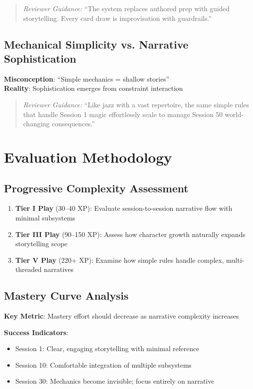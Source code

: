\documentclass[11pt]{article}
\begin{document}
\begin{quote}
\textit{Reviewer Guidance:} ``The system replaces authored prep with guided storytelling. Every card draw is improvisation with guardrails.''
\end{quote}

\subsection{Mechanical Simplicity vs. Narrative Sophistication}
\textbf{Misconception}: ``Simple mechanics = shallow stories'' \\
\textbf{Reality}: Sophistication emerges from constraint interaction

\begin{quote}
\textit{Reviewer Guidance:} ``Like jazz with a vast repertoire, the same simple rules that handle Session 1 magic effortlessly scale to manage Session 50 world-changing consequences.''
\end{quote}

\section{Evaluation Methodology}

\subsection{Progressive Complexity Assessment}
\begin{enumerate}
    \item \textbf{Tier I Play} (30--40 XP): Evaluate session-to-session narrative flow with minimal subsystems
    \item \textbf{Tier III Play} (90--150 XP): Assess how character growth naturally expands storytelling scope
    \item \textbf{Tier V Play} (220+ XP): Examine how simple rules handle complex, multi-threaded narratives
\end{enumerate}

\subsection{Mastery Curve Analysis}
\textbf{Key Metric}: Mastery effort should decrease as narrative complexity increases

\textbf{Success Indicators}:
\begin{itemize}
    \item Session 1: Clear, engaging storytelling with minimal reference
    \item Session 10: Comfortable integration of multiple subsystems
    \item Session 30: Mechanics become invisible; focus entirely on narrative
\end{itemize}
\end{document}
